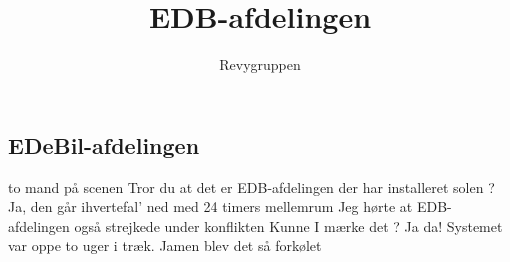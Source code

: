 \documentclass[danish]{article}
\title{EDB-afdelingen}
\author{Revygruppen}
\begin{document}
\maketitle

\begin{sketch}

\subsection*{EDeBil-afdelingen}

\scene to mand på scenen
 Tror du at det er EDB-afdelingen der har installeret solen ?
 Ja, den går ihvertefal' ned med 24 timers mellemrum
 Jeg hørte at EDB-afdelingen også strejkede under konflikten 
 Kunne I mærke det ?
 Ja da! Systemet var oppe to uger i træk.
 Jamen blev det så forkølet

\end{sketch}
\end{document}
